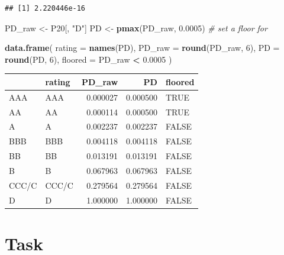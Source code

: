 \documentclass[
  11pt,
]{article}
\newenvironment{Shaded}{\begin{snugshade}}{\end{snugshade}}
\newcommand{\AttributeTok}[1]{\textcolor[rgb]{0.13,0.29,0.53}{#1}}
\newcommand{\CommentTok}[1]{\textcolor[rgb]{0.56,0.35,0.01}{\textit{#1}}}
\newcommand{\DecValTok}[1]{\textcolor[rgb]{0.00,0.00,0.81}{#1}}
\newcommand{\FloatTok}[1]{\textcolor[rgb]{0.00,0.00,0.81}{#1}}
\newcommand{\FunctionTok}[1]{\textcolor[rgb]{0.13,0.29,0.53}{\textbf{#1}}}
\newcommand{\NormalTok}[1]{#1}
\newcommand{\OtherTok}[1]{\textcolor[rgb]{0.56,0.35,0.01}{#1}}
\newcommand{\SpecialCharTok}[1]{\textcolor[rgb]{0.81,0.36,0.00}{\textbf{#1}}}
\newcommand{\StringTok}[1]{\textcolor[rgb]{0.31,0.60,0.02}{#1}}
\newcounter{none} %
\begin{document}
\begin{verbatim}
## [1] 2.220446e-16
\end{verbatim}

\begin{Shaded}
\begin{Highlighting}[]
\NormalTok{PD\_raw }\OtherTok{\textless{}{-}}\NormalTok{ P20[, }\StringTok{"D"}\NormalTok{]}
\NormalTok{PD }\OtherTok{\textless{}{-}} \FunctionTok{pmax}\NormalTok{(PD\_raw, }\FloatTok{0.0005}\NormalTok{) }\CommentTok{\# set a floor for}

\FunctionTok{data.frame}\NormalTok{(}
    \AttributeTok{rating =} \FunctionTok{names}\NormalTok{(PD),}
    \AttributeTok{PD\_raw =} \FunctionTok{round}\NormalTok{(PD\_raw, }\DecValTok{6}\NormalTok{),}
    \AttributeTok{PD =} \FunctionTok{round}\NormalTok{(PD, }\DecValTok{6}\NormalTok{),}
    \AttributeTok{floored =}\NormalTok{ PD\_raw }\SpecialCharTok{\textless{}} \FloatTok{0.0005}
\NormalTok{)}
\end{Highlighting}
\end{Shaded}

{\def\LTcaptype{none} %
\begin{longtable}[]{@{}llrrl@{}}
\toprule\noalign{}
& rating & PD\_raw & PD & floored \\
\midrule\noalign{}
\endhead
\bottomrule\noalign{}
\endlastfoot
AAA & AAA & 0.000027 & 0.000500 & TRUE \\
AA & AA & 0.000114 & 0.000500 & TRUE \\
A & A & 0.002237 & 0.002237 & FALSE \\
BBB & BBB & 0.004118 & 0.004118 & FALSE \\
BB & BB & 0.013191 & 0.013191 & FALSE \\
B & B & 0.067963 & 0.067963 & FALSE \\
CCC/C & CCC/C & 0.279564 & 0.279564 & FALSE \\
D & D & 1.000000 & 1.000000 & FALSE \\
\end{longtable}
}

\section{\texorpdfstring{\textbf{Task}}{Task}}\label{task-1}

\subsection{}\label{section-1}
\end{document}
